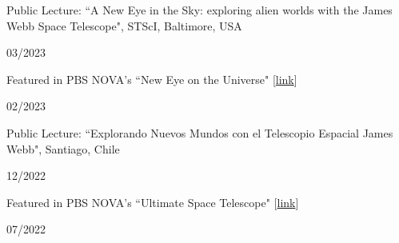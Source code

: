\documentclass[12pt, a4paper]{article} %
\begin{document}
\vspace{0.2cm}

\begin{minipage}[t]{0.7\textwidth}
\begin{flushleft}%
  \setlength{\leftskip}{0.2cm}%
Public Lecture: ``A New Eye in the Sky: exploring alien worlds with the James Webb Space Telescope", STScI, Baltimore, USA
\end{flushleft}
\end{minipage}
\begin{minipage}[t]{0.3\textwidth}
\hfill 03/2023
\end{minipage}

\vspace{0.2cm}

\begin{minipage}[t]{0.7\textwidth}
\begin{flushleft}%
  \setlength{\leftskip}{0.2cm}%
Featured in PBS NOVA's ``New Eye on the Universe"  [\href{https://www.pbs.org/video/new-eye-on-the-universe-zvzqn1/}{link}]
\end{flushleft}
\end{minipage}
\begin{minipage}[t]{0.3\textwidth}
\hfill 02/2023
\end{minipage}

\vspace{0.2cm}

\begin{minipage}[t]{0.7\textwidth}
\begin{flushleft}%
  \setlength{\leftskip}{0.2cm}%
Public Lecture: ``Explorando Nuevos Mundos con el Telescopio Espacial James Webb", Santiago, Chile
\end{flushleft}
\end{minipage}
\begin{minipage}[t]{0.3\textwidth}
\hfill 12/2022
\end{minipage}

\vspace{0.2cm}

\begin{minipage}[t]{0.7\textwidth}
\begin{flushleft}%
  \setlength{\leftskip}{0.2cm}%
Featured in PBS NOVA's ``Ultimate Space Telescope"  [\href{https://www.pbs.org/video/ultimate-space-telescope-gunryt/}{link}]
\end{flushleft}
\end{minipage}
\begin{minipage}[t]{0.3\textwidth}
\hfill 07/2022
\end{minipage}
\end{document}
